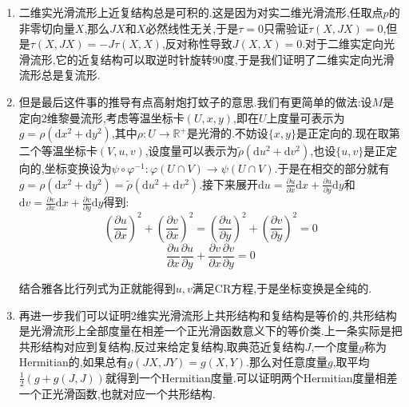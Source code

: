\begin{enumerate}
\begin{proof}
    	在$M$上取复坐标卡$(U,z_i)$,在$N$上取复坐标卡$(V,w_i)$,问题变成局部的,就设$f$是复空间开子集之间的光滑映射,设$f=(u_1+iv_1,\cdots,u_n+iv_n)$,有$f_*J_M\partial x_i=f_*\partial y_i=\frac{\partial u_k}{\partial y_i}\frac{\partial}{\partial u_k}+\frac{\partial v_k}{\partial y_i}\frac{\partial}{\partial v_k}$和$J_Nf_*(\partial x_i)=J_N\left(\frac{\partial u_k}{\partial x_i}\frac{\partial}{\partial u_k}+\frac{\partial v_k}{\partial x_i}\frac{\partial}{\partial v_k}\right)=-\frac{\partial v_k}{\partial x_i}\frac{\partial}{\partial u_k}+\frac{\partial u_k}{\partial x_i}\frac{\partial}{\partial v_k}$.比较系数得到$f$满足CR方程.
    \end{proof}
    \item 二维实光滑流形上近复结构总是可积的.这是因为对实二维光滑流形,任取点$p$的非零切向量$X$,那么$JX$和$X$必然线性无关,于是$\tau=0$只需验证$\tau(X,JX)=0$,但是$\tau(X,JX)=-J\tau(X,X)$,反对称性导致$J(X,X)=0$.对于二维实定向光滑流形,它的近复结构可以取逆时针旋转90度,于是我们证明了二维实定向光滑流形总是复流形.
    \item 但是最后这件事的推导有点高射炮打蚊子的意思.我们有更简单的做法:设$M$是定向2维黎曼流形,考虑等温坐标卡$(U,x,y)$,即在$U$上度量可表示为$g=\rho(\mathrm{d}x^2+\mathrm{d}y^2)$,其中$\rho:U\to\mathbb{R}^+$是光滑的.不妨设$\{x,y\}$是正定向的.现在取第二个等温坐标卡$(V,u,v)$,设度量可以表示为$\widetilde{\rho}(\mathrm{d}u^2+\mathrm{d}v^2)$,也设$\{u,v\}$是正定向的,坐标变换设为$\psi\circ\varphi^{-1}:\varphi(U\cap V)\to\psi(U\cap V)$.于是在相交的部分就有$g=\rho(\mathrm{d}x^2+\mathrm{d}y^2)=\widetilde{\rho}(\mathrm{d}u^2+\mathrm{d}v^2)$.接下来展开$\mathrm{d}u=\frac{\partial u}{\partial x}\mathrm{d}x+\frac{\partial u}{\partial y}\mathrm{d}y$和$\mathrm{d}v=\frac{\partial v}{\partial x}\mathrm{d}x+\frac{\partial v}{\partial y}\mathrm{d}y$得到:
    $$\left(\frac{\partial u}{\partial x}\right)^2+\left(\frac{\partial v}{\partial x}\right)^2=\left(\frac{\partial u}{\partial y}\right)^2+\left(\frac{\partial v}{\partial y}\right)^2=0$$
    $$\frac{\partial u}{\partial x}\frac{\partial u}{\partial y}+\frac{\partial v}{\partial x}\frac{\partial v}{\partial y}=0$$
    
    结合雅各比行列式为正就能得到$u,v$满足CR方程,于是坐标变换是全纯的.
    \item 再进一步我们可以证明2维实光滑流形上共形结构和复结构是等价的,共形结构是光滑流形上全部度量在相差一个正光滑函数意义下的等价类.上一条实际是把共形结构对应到复结构,反过来给定复结构,取典范近复结构$J$,一个度量$g$称为Hermitian的,如果总有$g(JX,JY)=g(X,Y)$.那么对任意度量$g$,取平均$\frac{1}{2}(g+g(J,J))$就得到一个Hermitian度量.可以证明两个Hermitian度量相差一个正光滑函数,也就对应一个共形结构.
\end{enumerate}



